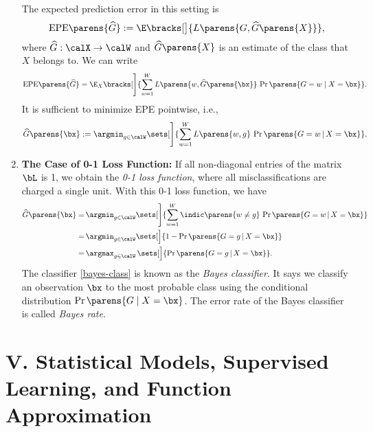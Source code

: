 \documentclass[12pt]{article}
\begin{document}
\begin{enumerate}[label=\textbf{\arabic*.}]
	The expected prediction error in this setting is 
	\begin{align*}
		\mathrm{EPE} \parens{\widehat{G}} := \E \bracks[\big]{L \parens{G, \widehat{G} \parens{X}}}, 
	\end{align*} 
	where $\widehat{G}: \calX \to \calW$ and $\widehat{G} \parens{X}$ is an estimate of the class that $X$ belongs to. We can write 
	\begin{align*}
		\text{EPE} \parens{\widehat{G}} = \E_X \bracks[\Bigg]{\sum_{w=1}^W L \parens{w, \widehat{G}\parens{\bx}} \, \Pr \parens{G = w \mid X = \bx}}. 
	\end{align*} 
	It is sufficient to minimize EPE pointwise, i.e., 
	\begin{align*}
		\widehat{G} \parens{\bx} := \argmin_{g \in \calW} \sets[\Bigg]{\sum_{w=1}^W L \parens{w, g} \, \Pr \parens{G = w \,\vert\, X = \bx}}. 
	\end{align*}
	
	\item \textbf{The Case of 0-1 Loss Function:} If all non-diagonal entries of the matrix $\bL$ is 1, we obtain the \emph{0-1 loss function}, where all misclassifications are charged a single unit. With this 0-1 loss function, we have 
	\begin{align}
		\widehat{G} \parens{\bx} = & \, \argmin_{g \in \calW} \sets[\Bigg]{ \sum_{w=1}^W \indic \parens{w \ne g} \, \Pr \parens{G = w \,\vert\, X = \bx }} \nonumber \\ 
		= & \, \argmin_{g \in \calW} \sets[\Big]{ 1 - \Pr \parens{G = g \,\vert\, X = \bx}} \nonumber \\ 
		= & \, \argmax_{g \in \calW} \, \sets[\Big]{\Pr \parens{G = g \,\vert\, X = \bx}}. \label{bayes-class}
	\end{align}
	The classifier \eqref{bayes-class} is known as the \textit{Bayes classifier}. It says we classify an observation $\bx$ to the most probable class using the conditional distribution $\Pr \parens{G \mid X = \bx}$. The error rate of the Bayes classifier is called \textit{Bayes rate}. 
\end{enumerate}

\section*{V. Statistical Models, Supervised Learning, and Function Approximation}
\end{document}
